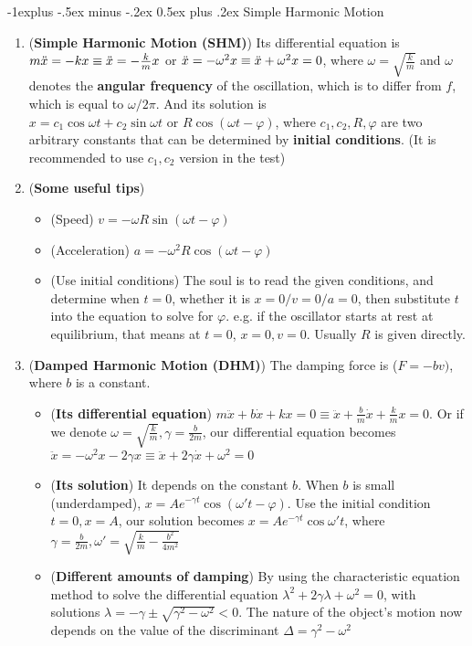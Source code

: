 \documentclass[10pt, landscape]{article}
\makeatletter
\renewcommand{\subsection}{\@startsection{subsection}{2}{0mm}%
                                {-1explus -.5ex minus -.2ex}%
                                {0.5ex plus .2ex}%
                                {\normalfont\normalsize\bfseries}}
\makeatother
\begin{document}
\begin{multicols}{4}
\subsection{Simple Harmonic Motion}
\begin{enumerate}
    \item (\textbf{Simple Harmonic Motion (SHM)}) Its differential equation is $m\Ddot{x}=-kx \equiv \Ddot{x}=-\frac{k}{m}x$ or $\Ddot{x}=-\omega^2x \equiv \Ddot{x}+\omega^2x=0$, where $\omega=\sqrt{\frac{k}{m}}$ and $\omega$ denotes the \textbf{angular frequency} of the oscillation, which is to differ from $f$, which is equal to $\omega / 2\pi$. And its solution is $x=c_1\cos \omega t+c_2 \sin\omega t\text{ or }R\cos(\omega t-\varphi)$, where $c_1,c_2,R,\varphi$ are two arbitrary constants that can be determined by \textbf{initial conditions}. (It is recommended to use $c_1,c_2$ version in the test)
    \item (\textbf{Some useful tips}) 
    \begin{itemize}
        \item (Speed) $v=-\omega R\sin(\omega t-\varphi)$
        \item (Acceleration) $a=-\omega^2R\cos(\omega t-\varphi)$
        \item (Use initial conditions) The soul is to read the given conditions, and determine when $t=0$, whether it is $x=0/v=0/a=0$, then substitute $t$ into the equation to solve for $\varphi$. e.g. if the oscillator starts at rest at equilibrium, that means at $t=0$, $x=0,v=0$. Usually $R$ is given directly.
    \end{itemize}
    \item (\textbf{Damped Harmonic Motion (DHM)}) The damping force is ($F=-bv)$, where $b$ is a constant.
    \begin{itemize}
        \item (\textbf{Its differential equation}) $m\ddot{x}+b\dot{x}+kx=0 \equiv \ddot{x}+\frac{b}{m}\dot{x}+\frac{k}{m}x=0$. Or if we denote $\omega=\sqrt{\frac{k}{m}}, \gamma=\frac{b}{2m}$, our differential equation becomes $\ddot{x}=-\omega^2x-2\gamma x\equiv \ddot{x}+2\gamma \dot{x}+\omega^2=0$
        \item (\textbf{Its solution}) It depends on the constant $b$. When $b$ is small (underdamped), $x=Ae^{-\gamma t}\cos(\omega't-\varphi)$. Use the initial condition $t=0, x=A$, our solution becomes $x=Ae^{-\gamma t}\cos\omega't$, where $\gamma=\frac{b}{2m}, \omega'=\sqrt{\frac{k}{m}-\frac{b^2}{4m^2}}$
        \item (\textbf{Different amounts of damping}) By using the characteristic equation method to solve the differential equation $\lambda^2+2\gamma\lambda+\omega^2=0$, with solutions $\lambda=-\gamma\pm\sqrt{\gamma^2-\omega^2}<0$. The nature of the object's motion now depends on the value of the discriminant $\Delta=\gamma^2-\omega^2$

\end{itemize}
\end{enumerate}
\end{multicols}
\end{document}
